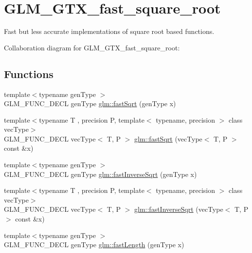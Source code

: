 \hypertarget{group__gtx__fast__square__root}{\section{G\-L\-M\-\_\-\-G\-T\-X\-\_\-fast\-\_\-square\-\_\-root}
\label{group__gtx__fast__square__root}
}


Fast but less accurate implementations of square root based functions.  


Collaboration diagram for G\-L\-M\-\_\-\-G\-T\-X\-\_\-fast\-\_\-square\-\_\-root\-:
\subsection*{Functions}
\begin{DoxyCompactItemize}
\item 
{\footnotesize template$<$typename gen\-Type $>$ }\\G\-L\-M\-\_\-\-F\-U\-N\-C\-\_\-\-D\-E\-C\-L gen\-Type \hyperlink{group__gtx__fast__square__root_ga6c460e9414a50b2fc455c8f64c86cdc9}{glm\-::fast\-Sqrt} (gen\-Type x)
\item 
{\footnotesize template$<$typename T , precision P, template$<$ typename, precision $>$ class vec\-Type$>$ }\\G\-L\-M\-\_\-\-F\-U\-N\-C\-\_\-\-D\-E\-C\-L vec\-Type$<$ T, P $>$ \hyperlink{group__gtx__fast__square__root_gaad9f601bbc3faa04dda384e4c4e1592c}{glm\-::fast\-Sqrt} (vec\-Type$<$ T, P $>$ const \&x)
\item 
{\footnotesize template$<$typename gen\-Type $>$ }\\G\-L\-M\-\_\-\-F\-U\-N\-C\-\_\-\-D\-E\-C\-L gen\-Type \hyperlink{group__gtx__fast__square__root_ga7f081b14d9c7035c8714eba5f7f75a8f}{glm\-::fast\-Inverse\-Sqrt} (gen\-Type x)
\item 
{\footnotesize template$<$typename T , precision P, template$<$ typename, precision $>$ class vec\-Type$>$ }\\G\-L\-M\-\_\-\-F\-U\-N\-C\-\_\-\-D\-E\-C\-L vec\-Type$<$ T, P $>$ \hyperlink{group__gtx__fast__square__root_ga903878071f92e51e551791e584a171a1}{glm\-::fast\-Inverse\-Sqrt} (vec\-Type$<$ T, P $>$ const \&x)
\item 
{\footnotesize template$<$typename gen\-Type $>$ }\\G\-L\-M\-\_\-\-F\-U\-N\-C\-\_\-\-D\-E\-C\-L gen\-Type \hyperlink{group__gtx__fast__square__root_gafe697d6287719538346bbdf8b1367c59}{glm\-::fast\-Length} (gen\-Type x)

\end{DoxyCompactItemize}
